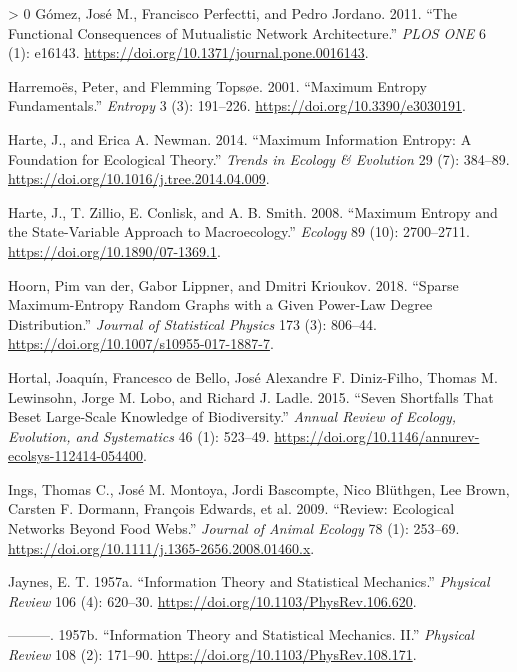 \documentclass[11pt]{article}
\newlength{\cslhangindent}
\newenvironment{CSLReferences}[3] %
 {%
  \setlength{\parindent}{0pt}
  \ifodd #1 \everypar{\setlength{\hangindent}{\cslhangindent}}\ignorespaces\fi
  \ifnum #2 > 0
  \setlength{\parskip}{#2\baselineskip}
  \fi
 }%
 {}
\begin{document}
\begin{CSLReferences}{1}{0}
\leavevmode\hypertarget{ref-Gomez2011FunConb}{}%
Gómez, José M., Francisco Perfectti, and Pedro Jordano. 2011. {``The
Functional Consequences of Mutualistic Network Architecture.''}
\emph{PLOS ONE} 6 (1): e16143.
\url{https://doi.org/10.1371/journal.pone.0016143}.

\leavevmode\hypertarget{ref-Harremoes2001MaxEnt}{}%
Harremoës, Peter, and Flemming Topsøe. 2001. {``Maximum Entropy
Fundamentals.''} \emph{Entropy} 3 (3): 191--226.
\url{https://doi.org/10.3390/e3030191}.

\leavevmode\hypertarget{ref-Harte2014MaxInf}{}%
Harte, J., and Erica A. Newman. 2014. {``Maximum Information Entropy: A
Foundation for Ecological Theory.''} \emph{Trends in Ecology \&
Evolution} 29 (7): 384--89.
\url{https://doi.org/10.1016/j.tree.2014.04.009}.

\leavevmode\hypertarget{ref-Harte2008MaxEnt}{}%
Harte, J., T. Zillio, E. Conlisk, and A. B. Smith. 2008. {``Maximum
Entropy and the State-Variable Approach to Macroecology.''}
\emph{Ecology} 89 (10): 2700--2711.
\url{https://doi.org/10.1890/07-1369.1}.

\leavevmode\hypertarget{ref-vanderHoorn2018SpaMaxa}{}%
Hoorn, Pim van der, Gabor Lippner, and Dmitri Krioukov. 2018. {``Sparse
Maximum-Entropy Random Graphs with a Given Power-Law Degree
Distribution.''} \emph{Journal of Statistical Physics} 173 (3): 806--44.
\url{https://doi.org/10.1007/s10955-017-1887-7}.

\leavevmode\hypertarget{ref-Hortal2015SevSho}{}%
Hortal, Joaquín, Francesco de Bello, José Alexandre F. Diniz-Filho,
Thomas M. Lewinsohn, Jorge M. Lobo, and Richard J. Ladle. 2015. {``Seven
Shortfalls That Beset Large-Scale Knowledge of Biodiversity.''}
\emph{Annual Review of Ecology, Evolution, and Systematics} 46 (1):
523--49. \url{https://doi.org/10.1146/annurev-ecolsys-112414-054400}.

\leavevmode\hypertarget{ref-Ings2009RevEco}{}%
Ings, Thomas C., José M. Montoya, Jordi Bascompte, Nico Blüthgen, Lee
Brown, Carsten F. Dormann, François Edwards, et al. 2009. {``Review:
Ecological Networks Beyond Food Webs.''} \emph{Journal of Animal
Ecology} 78 (1): 253--69.
\url{https://doi.org/10.1111/j.1365-2656.2008.01460.x}.

\leavevmode\hypertarget{ref-Jaynes1957InfThe}{}%
Jaynes, E. T. 1957a. {``Information Theory and Statistical Mechanics.''}
\emph{Physical Review} 106 (4): 620--30.
\url{https://doi.org/10.1103/PhysRev.106.620}.

\leavevmode\hypertarget{ref-Jaynes1957InfThea}{}%
---------. 1957b. {``Information Theory and Statistical Mechanics.
II.''} \emph{Physical Review} 108 (2): 171--90.
\url{https://doi.org/10.1103/PhysRev.108.171}.


\end{CSLReferences}
\end{document}
